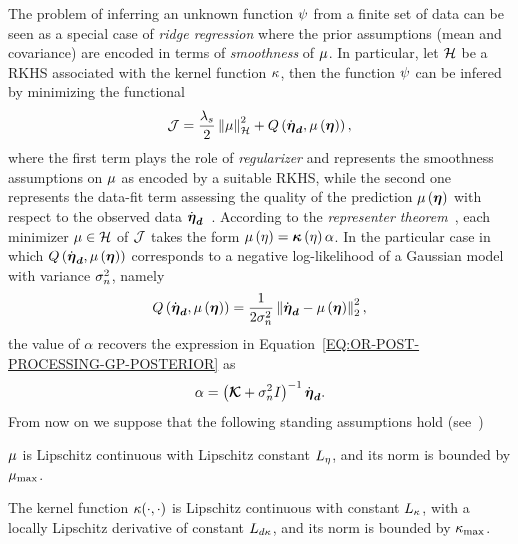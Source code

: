 The problem of inferring an unknown function $\psi$ from a finite set of data can be seen as a special case of \textit{ridge regression} where the
prior assumptions (mean and covariance) are encoded in terms of \emph{smoothness} of $\mu$.
In particular, let $\mathcal{H}$ be a RKHS associated with the kernel function $\kappa$, then the function $\psi$ can be infered by minimizing the functional
\begin{equation*}
   \mathcal{J} = \frac{\lambda_s}{2} \left \lVert {\mu} \right \rVert^2_{\mathcal{H}} + Q \left( \dot{\boldsymbol{\eta}}_{\boldsymbol{d}}, \mu \left( \boldsymbol{\eta} \right) \right),
\end{equation*}
where the first term plays the role of \textit{regularizer} and represents the smoothness assumptions on $\mu$
as encoded by a suitable RKHS, while the second one represents the data-fit term assessing the quality of the prediction
$\mu \left( \boldsymbol{\eta} \right)$ with respect to the observed data $\dot{\boldsymbol{\eta}}_{\boldsymbol{d}}$~\cite{rasmussen2003gaussian}.
According to the \textit{representer theorem}~\cite{o1986automatic}, each minimizer $\mu \in \mathcal{H}$ of $\mathcal{J}$ takes the form  
$\mu \left( \eta \right) = \boldsymbol{\kappa} \left( \eta \right)\alpha$. In the particular case in which $Q\left(\dot{\boldsymbol{\eta}}_{\boldsymbol{d}}, \mu\left(\boldsymbol{\eta}\right)\right)$ corresponds to a negative log-likelihood
of a Gaussian model with variance $\sigma_n^2$, namely
\begin{equation*}
   Q\left(\dot{\boldsymbol{\eta}}_{\boldsymbol{d}}, \mu\left(\boldsymbol{\eta}\right)\right) = \frac{1}{2 \sigma_n^2} \left \lVert {\dot{\boldsymbol{\eta}}_{\boldsymbol{d}}- \mu\left(\boldsymbol{\eta}\right)} \right \rVert^2_2,
\end{equation*}
the value of $\alpha$ recovers the expression in Equation~\eqref{EQ:OR-POST-PROCESSING-GP-POSTERIOR} as
\begin{equation*}
   \alpha = \left(\boldsymbol{\mathcal{K}} + \sigma_n^2 I\right)^{-1}\dot{\boldsymbol{\eta}}_{\boldsymbol{d}}.
\end{equation*}
From now on we suppose that the following standing assumptions hold (see~\cite[Assumption~2,~Assumption~3]{buisson2021joint})
\begin{assumption}%
   \label{ASSUM:MU-CONTINUOUS-BOUNDED}
   $\mu$ is Lipschitz continuous with Lipschitz constant $L_{\eta}$, and its norm is bounded by $\mu_{\text{max}}$.
\end{assumption}
\begin{assumption}%
   \label{ASSUM:K-CONTINUOUS-BOUNDED}
   The kernel function $\kappa(\cdot, \cdot)$ is Lipschitz continuous with constant $L_{\kappa}$, with a locally Lipschitz derivative of constant $L_{d\kappa}$,
   and its norm is bounded by $\kappa_{\text{max}}$.
\end{assumption}

